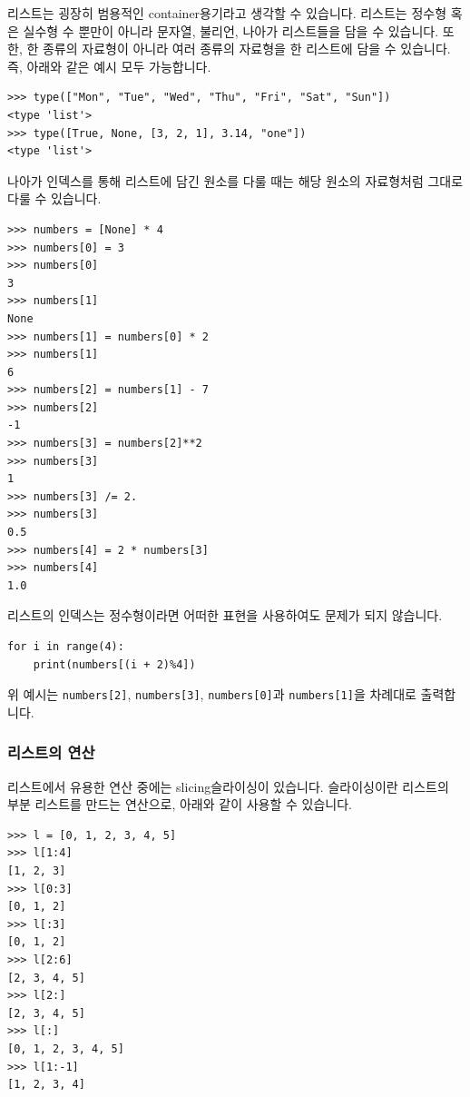 \documentclass[../main.tex]{subfiles}
\begin{document}
리스트는 굉장히 범용적인 container용기라고 생각할 수 있습니다.
리스트는 정수형 혹은 실수형 수 뿐만이 아니라 문자열, 불리언, 나아가 리스트들을 담을 수 있습니다.
또한, 한 종류의 자료형이 아니라 여러 종류의 자료형을 한 리스트에 담을 수 있습니다.
즉, 아래와 같은 예시 모두 가능합니다.
\begin{verbatim}
>>> type(["Mon", "Tue", "Wed", "Thu", "Fri", "Sat", "Sun"])
<type 'list'>
>>> type([True, None, [3, 2, 1], 3.14, "one"])
<type 'list'>
\end{verbatim}
나아가 인덱스를 통해 리스트에 담긴 원소를 다룰 때는 해당 원소의 자료형처럼 그대로 다룰 수 있습니다.
\begin{verbatim}
>>> numbers = [None] * 4
>>> numbers[0] = 3
>>> numbers[0]
3
>>> numbers[1]
None
>>> numbers[1] = numbers[0] * 2
>>> numbers[1]
6
>>> numbers[2] = numbers[1] - 7
>>> numbers[2]
-1
>>> numbers[3] = numbers[2]**2
>>> numbers[3]
1
>>> numbers[3] /= 2.
>>> numbers[3]
0.5
>>> numbers[4] = 2 * numbers[3]
>>> numbers[4]
1.0
\end{verbatim}

리스트의 인덱스는 정수형이라면 어떠한 표현을 사용하여도 문제가 되지 않습니다.
\begin{verbatim}
for i in range(4):
    print(numbers[(i + 2)%4])
\end{verbatim}
위 예시는 \texttt{numbers[2]}, \texttt{numbers[3]}, \texttt{numbers[0]}과 \texttt{numbers[1]}을 차례대로 출력합니다.

\subsubsection{리스트의 연산}
리스트에서 유용한 연산 중에는 slicing슬라이싱이 있습니다.
슬라이싱이란 리스트의 부분 리스트를 만드는 연산으로, 아래와 같이 사용할 수 있습니다.
\begin{verbatim}
>>> l = [0, 1, 2, 3, 4, 5]
>>> l[1:4]
[1, 2, 3]
>>> l[0:3]
[0, 1, 2]
>>> l[:3]
[0, 1, 2]
>>> l[2:6]
[2, 3, 4, 5]
>>> l[2:]
[2, 3, 4, 5]
>>> l[:]
[0, 1, 2, 3, 4, 5]
>>> l[1:-1]
[1, 2, 3, 4]
\end{verbatim}
\end{document}
